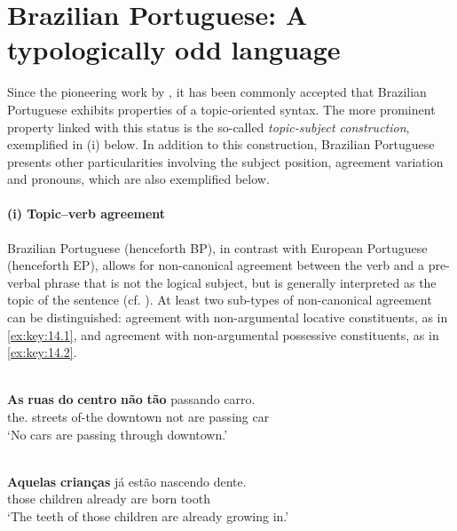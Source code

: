 \documentclass[output=paper]{langsci/langscibook}
\begin{document}
\section{Brazilian Portuguese: A typologically odd language}\label{sec:key:14.2}

Since the pioneering work by \citet{Pontes1987}, it has been commonly accepted
that Brazilian Portuguese exhibits properties of a topic-oriented syntax. The
more prominent property linked with this status is the so-called
\emph{topic-subject construction}, exemplified in (i) below. In addition to
this construction, Brazilian Portuguese presents other particularities
involving the subject position, agreement variation and pronouns, which are
also exemplified below.

\paragraph*{(i) Topic--verb agreement}

Brazilian Portuguese (henceforth \gls{BP}), in contrast with
European Portuguese (henceforth \gls{EP}), allows for
non-canonical agreement between the verb and a pre-verbal phrase that is not
the logical subject, but is generally interpreted as the topic of the sentence
(cf.
\citealt{DuarteKato2008,AvelarGalves2011,Toniette2013,MunhozNaves2012,Nunes2017}).
At least two sub-types of non-canonical agreement can be distinguished:
agreement with non-argumental locative constituents, as in \eqref{ex:key:14.1},
and agreement with non-argumental possessive constituents, as in
\eqref{ex:key:14.2}.

\ea\label{ex:key:14.1}\\
    \gll \textbf{As} \textbf{ruas} \textbf{do} \textbf{centro} \textbf{não} \textbf{tão} passando carro.\\
        the.\Pl{} streets of-the downtown not are passing car\\
    \glt ‘No cars are passing through downtown.’\\
\z

\ea\label{ex:key:14.2}\\
    \gll \textbf{Aquelas} \textbf{crianças} já estão nascendo dente.\\
        those children already are born tooth\\
    \glt ‘The teeth of those children are already growing in.’
\z
\end{document}

